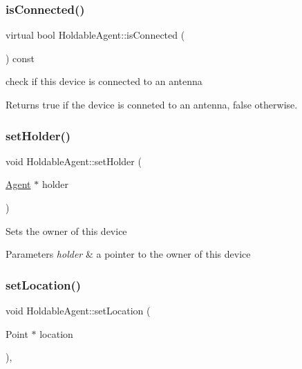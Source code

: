 \mbox{\label{class_holdable_agent_a1578388e51fefe7c19cd3b7c93a184eb}} 
\subsubsection{\texorpdfstring{is\+Connected()}{isConnected()}}
{\footnotesize\ttfamily virtual bool Holdable\+Agent\+::is\+Connected (\begin{DoxyParamCaption}{ }\end{DoxyParamCaption}) const\hspace{0.3cm}{\ttfamily [virtual]}}

check if this device is connected to an antenna \begin{DoxyReturn}{Returns}
true if the device is conneted to an antenna, false otherwise. 
\end{DoxyReturn}
\mbox{\label{class_holdable_agent_a39b53c9c6cacca716f38fccc520e9f52}} 
\subsubsection{\texorpdfstring{set\+Holder()}{setHolder()}}
{\footnotesize\ttfamily void Holdable\+Agent\+::set\+Holder (\begin{DoxyParamCaption}\item[{\hyperlink{class_agent}{Agent} $\ast$}]{holder }\end{DoxyParamCaption})}

Sets the owner of this device 
\begin{DoxyParams}{Parameters}
{\em holder} & a pointer to the owner of this device \\
\hline
\end{DoxyParams}
\mbox{\label{class_holdable_agent_aec98d2fe325b48d9a84ad3dad44700e0}} 
\subsubsection{\texorpdfstring{set\+Location()}{setLocation()}}
{\footnotesize\ttfamily void Holdable\+Agent\+::set\+Location (\begin{DoxyParamCaption}\item[{Point $\ast$}]{location }\end{DoxyParamCaption})\hspace{0.3cm}{\ttfamily [override]}, {\ttfamily [virtual]}}

